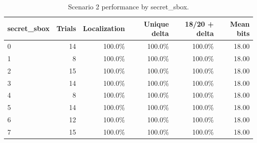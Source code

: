 \begin{table}[t]
\centering
\caption{Scenario 2 performance by secret\_sbox.}
\label{tab:s2-per_sbox}
\begin{tabular}{lrrrrr}
\toprule
secret\_sbox & Trials & Localization & Unique delta & 18/20 + delta & Mean bits \\
\midrule
0 & 14 & 100.0\% & 100.0\% & 100.0\% & 18.00 \\
1 & 8 & 100.0\% & 100.0\% & 100.0\% & 18.00 \\
2 & 15 & 100.0\% & 100.0\% & 100.0\% & 18.00 \\
3 & 14 & 100.0\% & 100.0\% & 100.0\% & 18.00 \\
4 & 8 & 100.0\% & 100.0\% & 100.0\% & 18.00 \\
5 & 14 & 100.0\% & 100.0\% & 100.0\% & 18.00 \\
6 & 12 & 100.0\% & 100.0\% & 100.0\% & 18.00 \\
7 & 15 & 100.0\% & 100.0\% & 100.0\% & 18.00 \\
\bottomrule
\end{tabular}
\end{table}
